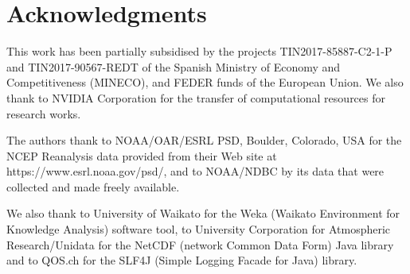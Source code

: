 
\chapter{Acknowledgments}

	\begin{onehalfspace}
	
		This work has been partially subsidised by the projects TIN2017-85887-C2-1-P and TIN2017-90567-REDT of the Spanish Ministry of Economy and Competitiveness (MI\-NE\-CO), and FEDER funds of the European Union. We also thank to NVIDIA Corporation for the transfer of computational resources for research works.
	
		The authors thank to NOAA/OAR/ESRL PSD, Boulder, Colorado, USA for the NCEP Reanalysis data provided from their Web site at https://www.esrl.noaa.gov/psd/, and to NOAA/NDBC by its data that were collected and made freely available.
		
		We also thank to University of Waikato for the Weka (Waikato Environment for Knowledge Analysis) software tool, to University Corporation for Atmospheric Research/Unidata for the NetCDF (network Common Data Form) Java library and to QOS.ch for the SLF4J (Simple Logging Facade for Java) library.
	
	\end{onehalfspace}
